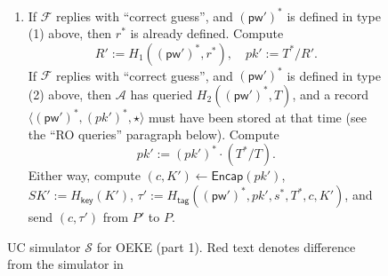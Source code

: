 \documentclass{article}
\theoremstyle{plain}
\theoremstyle{definition}
\theoremstyle{remark}
\newcommand{\adv}{\mathcal{A}}
\renewcommand{\sim}{\mathcal{S}}
\newcommand{\func}{\mathcal{F}}
\newcommand{\Encap}{\mathsf{Encap}}
\newcommand{\Hkey}{H_\mathsf{key}}
\newcommand{\Htag}{H_\mathsf{tag}}
\newcommand{\pw}{\mathsf{pw}}
\begin{document}
\begin{figure}[H]
\begin{framed}
\begin{small}
\begin{enumerate}
\begin{enumerate}
\begin{enumerate}
              \item If $\func$ replies with ``correct guess'', and $(\pw')^*$ is defined in type (1) above, then $r^*$ is already defined. Compute
                  \[
                  R' := H_1((\pw')^*,r^*), \quad pk' := T^*/R'.
                  \]
                  If $\func$ replies with ``correct guess'', and $(\pw')^*$ is defined in type (2) above, then $\adv$ has queried $H_2((\pw')^*,T)$, and a record $\langle(\pw')^*,(pk')^*,\star\rangle$ must have been stored at that time (see the ``RO queries'' paragraph below). Compute
                  \[
                  pk' := (pk')^* \cdot (T^*/T).
                  \]
                  Either way, compute $(c,K') \gets \Encap(pk')$, $SK' := \Hkey(K')$, $\tau' := \Htag((\pw')^*,pk',s^*,T^*,c,K')$, and send $(c,\tau')$ from $P'$ to $P$.
            \end{enumerate}
      \end{enumerate}
\end{enumerate}
\end{small}
\end{framed}
\caption{UC simulator $\sim$ for OEKE (part 1). {\color{red}Red} text denotes difference from the simulator in \cite{EPRINT:ArrBarJar25}}
\label{fig:oeke-sim1}
\end{figure}
\end{document}
